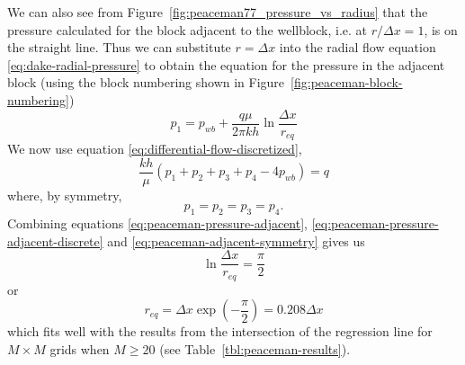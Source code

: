 We can also see from Figure~\ref{fig:peaceman77_pressure_vs_radius} that the pressure calculated for the block adjacent to the wellblock, i.e. at $r/\Delta x=1$, is on the straight line. Thus we can substitute $r=\Delta x$ into the radial flow equation \eqref{eq:dake-radial-pressure} to obtain the equation for the pressure in the adjacent block (using the block numbering shown in Figure~\ref{fig:peaceman-block-numbering})
\begin{equation}
    \label{eq:peaceman-pressure-adjacent}
    p_1 = p_{wb} + \frac{q\mu}{2\pi kh} \ln{\frac{\Delta x}{r_{eq}}}
\end{equation}
We now use equation \eqref{eq:differential-flow-discretized},
\begin{equation}
    \label{eq:peaceman-pressure-adjacent-discrete}
    \frac{kh}{\mu} \left( p_1 + p_2 + p_3 + p_4 -4p_{wb}  \right) = q
\end{equation}
where, by symmetry,
\begin{equation}
    \label{eq:peaceman-adjacent-symmetry}
    p_1=p_2=p_3=p_4.
\end{equation}
Combining equations \eqref{eq:peaceman-pressure-adjacent}, \eqref{eq:peaceman-pressure-adjacent-discrete} and \eqref{eq:peaceman-adjacent-symmetry} gives us
\begin{equation}
    \ln{\frac{\Delta x}{r_{eq}}} = \frac{\pi}{2}
\end{equation}
or
\begin{equation}
    r_{eq} = \Delta x \exp{\left( -\frac{\pi}{2} \right)} = 0.208 \Delta x
\end{equation}
which fits well with the results from the intersection of the regression line for $M\times M$ grids when $M\geq 20$ (see Table~\ref{tbl:peaceman-results}).



